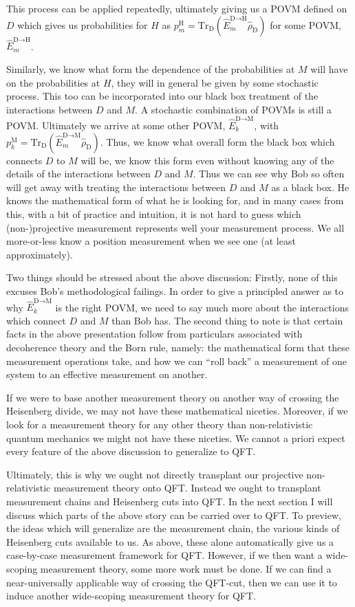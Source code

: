 \documentclass[12pt,prd,superscriptaddress,floatfix,amsmath,amssymb,amsfonts,nofootinbib]{revtex4-2}
\begin{document}
This process can be applied repeatedly, ultimately giving us a POVM defined on $D$ which gives us probabilities for $H$ as \mbox{$p_m^\text{H}=\text{Tr}_\text{D}(\hat E_m^{\text{D}\to\text{H}}\hat\rho_\text{D})$} for some POVM, $\hat E_m^{\text{D}\to\text{H}}$.

Similarly, we know what form the dependence of the probabilities at $M$ will have on the probabilities at $H$, they will in general be given by some stochastic process. This too can be incorporated into our black box treatment of the interactions between $D$ and $M$. A stochastic combination of POVMs is still a POVM. Ultimately we arrive at some other POVM, $\hat E_k^{\text{D}\to\text{M}}$, with $p_k^\text{M}=\text{Tr}_\text{D}(\hat E_m^{\text{D}\to\text{M}}\hat\rho_\text{D})$. Thus, we know what overall form the black box which connects $D$ to $M$ will be, we know this form even without knowing any of the details of the interactions between $D$ and $M$. Thus we can see why Bob so often will get away with treating the interactions between $D$ and $M$ as a black box. He knows the mathematical form of what he is looking for, and in many cases from this, with a bit of practice and intuition, it is not hard to guess which (non-)projective measurement represents well your measurement process. We all more-or-less know a position measurement when we see one (at least approximately).

Two things should be stressed about the above discussion: Firstly, none of this excuses Bob's methodological failings. In order to give a principled answer as to why $\hat E_k^{\text{D}\to\text{M}}$ is the right POVM, we need to say much more about the interactions which connect $D$ and $M$ than Bob has. The second thing to note is that certain facts in the above presentation follow from particulars associated with decoherence theory and the Born rule, namely: the mathematical form that these measurement operations take, and how we can ``roll back'' a measurement of one system to an effective measurement on another. 

If we were to base another measurement theory on another way of crossing the Heisenberg divide, we may not have these mathematical niceties. Moreover, if we look for a measurement theory for any other theory than non-relativistic quantum mechanics we might not have these niceties. We cannot a priori expect every feature of the above discussion to generalize to QFT. 

Ultimately, this is why we ought not directly transplant our projective non-relativistic measurement theory onto QFT. Instead we ought to transplant measurement chains and Heisenberg cuts into QFT. In the next section I will discuss which parts of the above story can be carried over to QFT. To preview, the ideas which will generalize are the measurement chain, the various kinds of Heisenberg cuts available to us. As above, these alone automatically give us a case-by-case measurement framework for QFT. However, if we then want a wide-scoping measurement theory, some more work must be done. If we can find a near-universally applicable way of crossing the QFT-cut, then we can use it to induce another wide-scoping measurement theory for QFT. 
\end{document}
